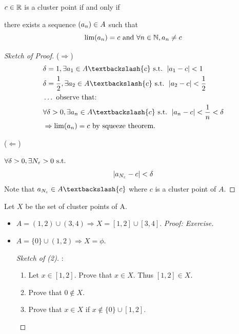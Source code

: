\documentclass[a4paper,12pt]{article}
\begin{document}
\begin{theorem}
    \(c\in\mathbb{R}\) is a cluster point if and only if 

    there exists a sequence \((a_{n})\in A\) such that 
    \[\lim(a _{n })=c \text{ and }\forall n\in\mathbb{N}, a_n\neq c\]

    \begin{proof}[Sketch of Proof](\(\Rightarrow\))
        \begin{align*}
            &\delta=1, \exists a_1 \in A \textbackslash \{c \} \st \abs{a_1-c}<1\\
            &\delta=\frac{1}{2}, \exists a_2\in A \textbackslash \{c \} \st \abs{a_2-c }<\frac{1}{2}\\
            &\dots\text{ observe that: }\\
            &\forall \delta>0, \exists a_n\in A \textbackslash \{c\} \st \abs{a_n-c}<\frac{1}{n }<\delta\\
            &\Rightarrow \lim\seq{a }{n}=c\text{ by squeeze theorem.}
        \end{align*}

        (\(\Leftarrow\))

        \(\forall\delta>0,\exists N_\varepsilon>0\text{ s.t. }\)
        \[\left\lvert a_{N_\varepsilon}-c\right\rvert<\delta\]
        Note that \(a_{N_\varepsilon}\in A\textbackslash\{c\}\) where \(c\) is a cluster point of \(A\).
    \end{proof}
    \newpage

    \begin{example}
        Let \(X\) be the set of cluster points of A. 

        \begin{itemize}
            \item \(A=(1,2)\cup (3,4)\Rightarrow X=[1,2]\cup [3,4]\). 
            \textit{Proof: Exercise.}
            \item \(A=\{0\}\cup (1,2)\Rightarrow X=\phi\).
            \begin{proof}[Sketch of (2)]:
                \begin{enumerate}
                    \item Let \(x\in[1,2]\). Prove that \(x\in X\). Thus \([1,2]\in X\).
                    \item Prove that \(0\notin X\).
                    \item Prove that \(x\in X\) if \(x\notin \{0\}\cup [1,2]\).
                \end{enumerate}
            \end{proof}
        \end{itemize}
    \end{example}


\end{theorem}
\end{document}
